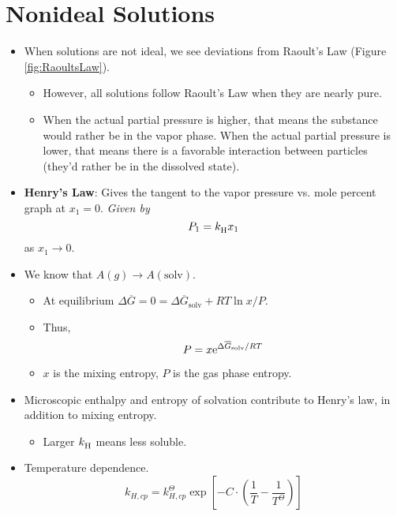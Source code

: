 \documentclass[../notes.tex]{subfiles}
\begin{document}
\section{Nonideal Solutions}
\begin{itemize}
    \item {}When solutions are not ideal, we see deviations from Raoult's Law (Figure \ref{fig:RaoultsLaw}).
    \begin{itemize}
        \item However, all solutions follow Raoult's Law when they are nearly pure.
        \item When the actual partial pressure is higher, that means the substance would rather be in the vapor phase. When the actual partial pressure is lower, that means there is a favorable interaction between particles (they'd rather be in the dissolved state).
    \end{itemize}
    \item \textbf{Henry's Law}: Gives the tangent to the vapor pressure vs. mole percent graph at $x_1=0$. \emph{Given by}
    \begin{equation*}
        P_1 = \kH x_1
    \end{equation*}
    as $x_1\to 0$.
    \item We know that $A(g)\to A(\text{solv})$.
    \begin{itemize}
        \item At equilibrium $\Delta\overline{G}=0=\Delta\overline{G}_\text{solv}+RT\ln x/P$.
        \item Thus,
        \begin{equation*}
            P = x\e[\Delta\overline{G}_\text{solv}/RT]
        \end{equation*}
        \item $x$ is the mixing entropy, $P$ is the gas phase entropy.
    \end{itemize}
    \item Microscopic enthalpy and entropy of solvation contribute to Henry's law, in addition to mixing entropy.
    \begin{itemize}
        \item Larger $\kH$ means less soluble.
    \end{itemize}
    \item Temperature dependence.
    \begin{equation*}
        k_{H,cp} = k_{H,cp}^\Theta\exp\left[ -C\cdot\left( \frac{1}{T}-\frac{1}{T^\Theta} \right) \right]
    \end{equation*}

\end{itemize}
\end{document}
